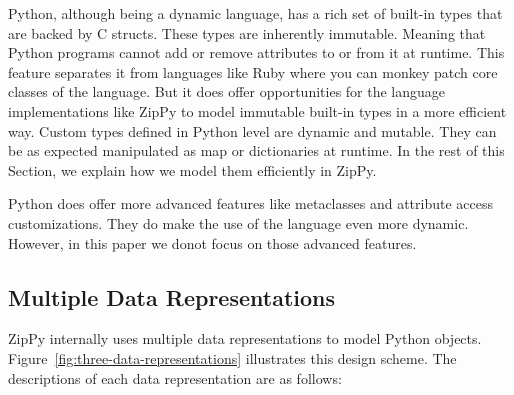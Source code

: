 Python, although being a dynamic language, has a rich set of built-in types that are backed by C structs.
These types are inherently immutable.
Meaning that Python programs cannot add or remove attributes to or from it at runtime.
This feature separates it from languages like Ruby where you can monkey patch core classes of the language.
But it does offer opportunities for the language implementations like ZipPy to model immutable built-in types in a more efficient way.
Custom types defined in Python level are dynamic and mutable.
They can be as expected manipulated as map or dictionaries at runtime.
In the rest of this Section, we explain how we model them efficiently in ZipPy.

Python does offer more advanced features like metaclasses and attribute access customizations.
They do make the use of the language even more dynamic.
However, in this paper we donot focus on those advanced features.

\subsection{Multiple Data Representations}

ZipPy internally uses multiple data representations to model Python objects.
Figure~\ref{fig:three-data-representations} illustrates this design scheme.
The descriptions of each data representation are as follows:

